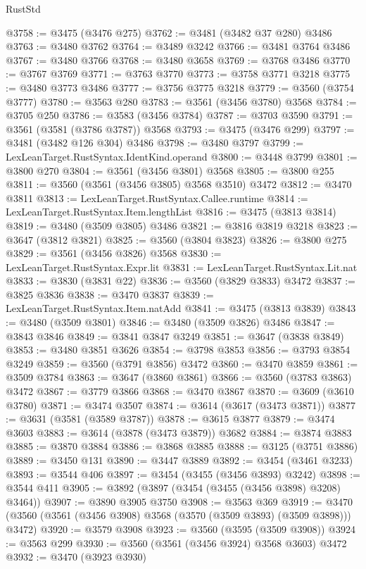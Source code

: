 \begin{lexlean}{RustStd}
\begin{coremodule}
@3758 := @3475 (@3476 @275)
@3762 := @3481 (@3482 @37 @280) @3486
@3763 := @3480 @3762
@3764 := @3489 @3242
@3766 := @3481 @3764 @3486
@3767 := @3480 @3766
@3768 := @3480 @3658
@3769 := @3768 @3486
@3770 := @3767 @3769
@3771 := @3763 @3770
@3773 := @3758 @3771 @3218
@3775 := @3480 @3773 @3486
@3777 := @3756 @3775 @3218
@3779 := @3560 (@3754 @3777)
@3780 := @3563 @280
@3783 := @3561 (@3456 @3780) @3568
@3784 := @3705 @250
@3786 := @3583 (@3456 @3784)
@3787 := @3703 @3590
@3791 := @3561 (@3581 (@3786 @3787)) @3568
@3793 := @3475 (@3476 @299)
@3797 := @3481 (@3482 @126 @304) @3486
@3798 := @3480 @3797
@3799 := LexLeanTarget.RustSyntax.IdentKind.operand
@3800 := @3448 @3799
@3801 := @3800 @270
@3804 := @3561 (@3456 @3801) @3568
@3805 := @3800 @255
@3811 := @3560 (@3561 (@3456 @3805) @3568 @3510) @3472
@3812 := @3470 @3811
@3813 := LexLeanTarget.RustSyntax.Callee.runtime
@3814 := LexLeanTarget.RustSyntax.Item.lengthList
@3816 := @3475 (@3813 @3814)
@3819 := @3480 (@3509 @3805) @3486
@3821 := @3816 @3819 @3218
@3823 := @3647 (@3812 @3821)
@3825 := @3560 (@3804 @3823)
@3826 := @3800 @275
@3829 := @3561 (@3456 @3826) @3568
@3830 := LexLeanTarget.RustSyntax.Expr.lit
@3831 := LexLeanTarget.RustSyntax.Lit.nat
@3833 := @3830 (@3831 @22)
@3836 := @3560 (@3829 @3833) @3472
@3837 := @3825 @3836
@3838 := @3470 @3837
@3839 := LexLeanTarget.RustSyntax.Item.natAdd
@3841 := @3475 (@3813 @3839)
@3843 := @3480 (@3509 @3801)
@3846 := @3480 (@3509 @3826) @3486
@3847 := @3843 @3846
@3849 := @3841 @3847 @3249
@3851 := @3647 (@3838 @3849)
@3853 := @3480 @3851 @3626
@3854 := @3798 @3853
@3856 := @3793 @3854 @3249
@3859 := @3560 (@3791 @3856) @3472
@3860 := @3470 @3859
@3861 := @3509 @3784
@3863 := @3647 (@3860 @3861)
@3866 := @3560 (@3783 @3863) @3472
@3867 := @3779 @3866
@3868 := @3470 @3867
@3870 := @3609 (@3610 @3780)
@3871 := @3474 @3507
@3874 := @3614 (@3617 (@3473 @3871))
@3877 := @3631 (@3581 (@3589 @3787))
@3878 := @3615 @3877
@3879 := @3474 @3603
@3883 := @3614 (@3878 (@3473 @3879)) @3682
@3884 := @3874 @3883
@3885 := @3870 @3884
@3886 := @3868 @3885
@3888 := @3125 (@3751 @3886)
@3889 := @3450 @131
@3890 := @3447 @3889
@3892 := @3454 (@3461 @3233)
@3893 := @3544 @406
@3897 := @3454 (@3455 (@3456 @3893) @3242)
@3898 := @3544 @411
@3905 := @3892 (@3897 (@3454 (@3455 (@3456 @3898) @3208) @3464))
@3907 := @3890 @3905 @3750
@3908 := @3563 @369
@3919 := @3470 (@3560 (@3561 (@3456 @3908) @3568 (@3570 (@3509 @3893) (@3509 @3898))) @3472)
@3920 := @3579 @3908
@3923 := @3560 (@3595 (@3509 @3908))
@3924 := @3563 @299
@3930 := @3560 (@3561 (@3456 @3924) @3568 @3603) @3472
@3932 := @3470 (@3923 @3930)

\end{coremodule}
\end{lexlean}
